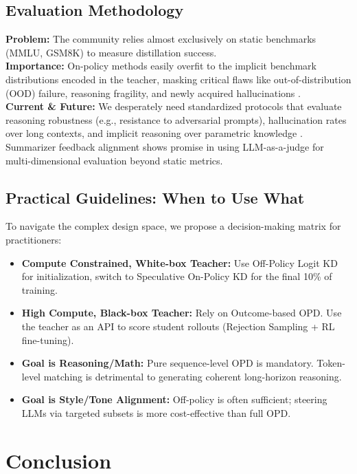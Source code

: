 \subsection{Evaluation Methodology}
\textbf{Problem:} The community relies almost exclusively on static benchmarks (MMLU, GSM8K) to measure distillation success. \\
\textbf{Importance:} On-policy methods easily overfit to the implicit benchmark distributions encoded in the teacher, masking critical flaws like out-of-distribution (OOD) failure, reasoning fragility, and newly acquired hallucinations \citep{arxiv_2405_05904}. \\
\textbf{Current \& Future:} We desperately need standardized protocols that evaluate reasoning robustness (e.g., resistance to adversarial prompts), hallucination rates over long contexts, and implicit reasoning over parametric knowledge \citep{arxiv_2405_15071}. Summarizer feedback alignment \citep{arxiv_2410_13116} shows promise in using LLM-as-a-judge for multi-dimensional evaluation beyond static metrics.

\subsection{Practical Guidelines: When to Use What}
To navigate the complex design space, we propose a decision-making matrix for practitioners:
\begin{itemize}
    \item \textbf{Compute Constrained, White-box Teacher:} Use Off-Policy Logit KD for initialization, switch to Speculative On-Policy KD for the final 10\% of training.
    \item \textbf{High Compute, Black-box Teacher:} Rely on Outcome-based OPD. Use the teacher as an API to score student rollouts (Rejection Sampling + RL fine-tuning).
    \item \textbf{Goal is Reasoning/Math:} Pure sequence-level OPD is mandatory. Token-level matching is detrimental to generating coherent long-horizon reasoning.
    \item \textbf{Goal is Style/Tone Alignment:} Off-policy is often sufficient; steering LLMs via targeted subsets \citep{arxiv_2406_00888} is more cost-effective than full OPD.
\end{itemize}

\section{Conclusion}
\label{sec:conclusion}

